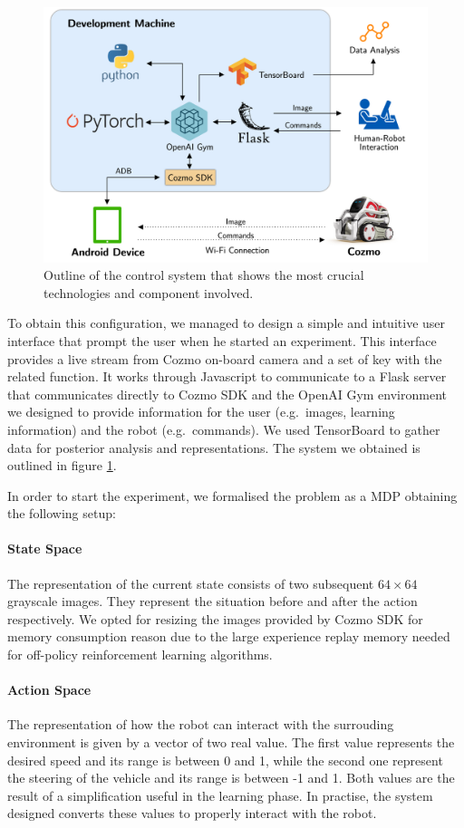 \documentclass[10pt,twocolumn,letterpaper]{article}
\begin{document}
\begin{figure}[tbp]
    \centering
    \includegraphics[width=0.97\columnwidth]{cozmo-system.png}
    \caption[Outline of the control system]{Outline of the control system that shows the most crucial technologies and component involved.}
    \label{system}
\end{figure}

To obtain this configuration, we managed to design a simple and intuitive user interface that prompt the user when he started an experiment. This interface provides a live stream from Cozmo on-board camera and a set of key with the related function. It works through Javascript to communicate to a Flask server that communicates directly to Cozmo SDK and the OpenAI Gym environment we designed to provide information for the user (e.g.\ images, learning information) and the robot (e.g.\ commands). We used TensorBoard to gather data for posterior analysis and representations. The system we obtained is outlined in figure \ref{system}.

In order to start the experiment, we formalised the problem as a MDP obtaining the following setup:

\paragraph{State Space} The representation of the current state consists of two subsequent $64 \times 64$ grayscale images. They represent the situation before and after the action respectively. We opted for resizing the images provided by Cozmo SDK for memory consumption reason due to the large experience replay memory needed for off-policy reinforcement learning algorithms.
\paragraph{Action Space} The representation of how the robot can interact with the surrouding environment is given by a vector of two real value. The first value represents the desired speed and its range is between 0 and 1, while the second one represent the steering of the vehicle and its range is between -1 and 1. Both values are the result of a simplification useful in the learning phase. In practise, the system designed converts these values to properly interact with the robot.
\end{document}
